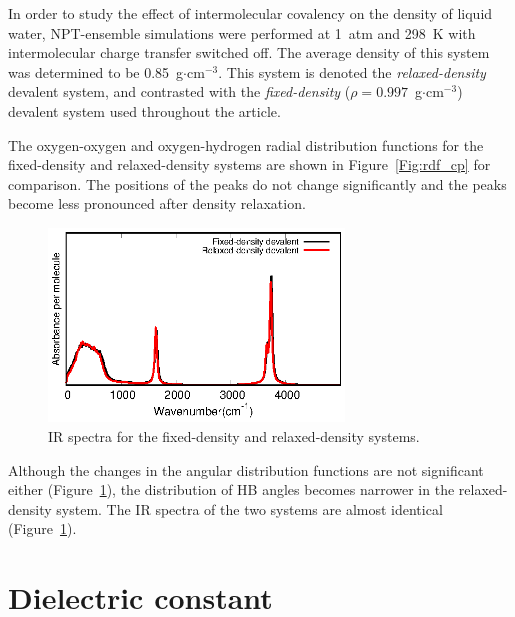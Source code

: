 \documentclass[journal=jacsat,manuscript=article]{achemso}
\begin{document}
In order to study the effect of intermolecular covalency on the density of liquid water, NPT-ensemble simulations were performed at 1~atm and 298~K with intermolecular charge transfer switched off. The average density of this system was determined to be 0.85~g$\cdot$cm$^{-3}$. 
This system is denoted the \emph{relaxed-density} devalent system, and contrasted with the \emph{fixed-density} ($\rho = 0.997$~g$\cdot$cm$^{-3}$) devalent system used throughout the article. 

The oxygen-oxygen and oxygen-hydrogen radial distribution functions for the fixed-density and relaxed-density systems are shown in Figure~\ref{Fig:rdf_cp} for comparison. 
The positions of the peaks do not change significantly and the peaks become less pronounced after density relaxation.

\begin{figure}
\includegraphics[width=0.7\textwidth]{cp_ir}
\caption{
IR spectra for the fixed-density and relaxed-density systems.}\label{Fig:ir_cp}
\end{figure} 

Although the changes in the angular distribution functions are not significant either (Figure~\ref{Fig:ir_cp}), the distribution of HB angles becomes narrower in the relaxed-density system. The IR spectra of the two systems are almost identical (Figure~\ref{Fig:ir_cp}).

%

\section{Dielectric constant} 
\end{document}
